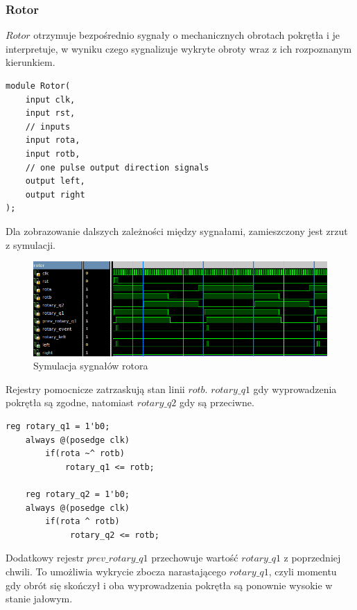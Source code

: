 \documentclass[a4paper,12pt]{article}
\begin{document}
\subsubsection{Rotor}
$Rotor$ otrzymuje bezpośrednio sygnały o mechanicznych obrotach pokrętła i je interpretuje, w wyniku czego sygnalizuje wykryte obroty wraz z ich rozpoznanym kierunkiem.
\begin{lstlisting}[label=Rotor,caption=Rotor.v]
module Rotor(
    input clk,
    input rst,
    // inputs
    input rota,
    input rotb,
    // one pulse output direction signals
    output left,
    output right
);
\end{lstlisting}

Dla zobrazowanie dalszych zależności między sygnałami, zamieszczony jest zrzut z symulacji.
\begin{figure}[htb]
   \centering
   \includegraphics[width=15cm]{grafika/rotor.png}
   \caption{Symulacja sygnałów rotora}
\end{figure}

Rejestry pomocnicze zatrzaskują stan linii $rotb$. $rotary\_q1$ gdy wyprowadzenia pokrętła są zgodne, natomiast $rotary\_q2$ gdy są przeciwne.
\begin{lstlisting}[label=Rotor,caption=Rotor.v,firstnumber=12]
    reg rotary_q1 = 1'b0;
    always @(posedge clk)
        if(rota ~^ rotb)
            rotary_q1 <= rotb;

    reg rotary_q2 = 1'b0;
    always @(posedge clk)
        if(rota ^ rotb)
             rotary_q2 <= rotb;
\end{lstlisting}

Dodatkowy rejestr $prev\_rotary\_q1$ przechowuje wartość $rotary\_q1$ z poprzedniej chwili. To umożliwia wykrycie zbocza narastającego $rotary\_q1$, czyli momentu gdy obrót się skończył i oba wyprowadzenia pokrętła są ponownie wysokie w stanie jałowym.
\end{document}
